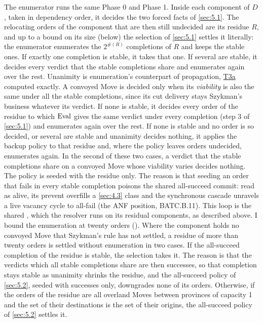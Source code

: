 \documentclass[12pt,a4paper]{article}
\begin{document}
The enumerator runs the same Phase 0 and Phase 1.
Inside each component of $D$, taken in dependency order, it decides the two forced facts of \cref{sec:5.1}.
The relocating orders of the component that are then still undecided are its residue $R$, and up to a bound on its size (below) the selection of \cref{sec:5.1} settles it literally: the enumerator enumerates the $2^{\#(R)}$ completions of $R$ and keeps the stable ones.
If exactly one completion is stable, it takes that one.
If several are stable, it decides every verdict that the stable completions share and enumerates again over the rest.
Unanimity is enumeration's counterpart of propagation, \hyperref[thm:T3]{T3a} computed exactly.
A convoyed Move is decided only when its \emph{viability} is also the same under all the stable completions, since its cut delivery stays Szykman's business whatever its verdict.
If none is stable, it decides every order of the residue to which $\operatorname{Eval}$ gives the same verdict under every completion (step 3 of \cref{sec:5.1}) and enumerates again over the rest.
If none is stable and no order is so decided, or several are stable and unanimity decides nothing, it applies the backup policy to that residue and, where the policy leaves orders undecided, enumerates again.
In the second of these two cases, a verdict that the stable completions share on a convoyed Move whose viability varies decides nothing.
The policy is seeded with the residue only.
The reason is that seeding an order that fails in every stable completion poisons the shared all-succeed commit: read as alive, its prevent overfills a \cref{sec:4.3} class and the synchronous cascade unravels a live vacancy cycle to all-fail (the ANF position, BATC.B.11).
This loop is the shared , which the resolver runs on its residual components, as described above.
I bound the enumeration at twenty orders ().
Where the component holds no convoyed Move that Szykman's rule has not settled, a residue of more than twenty orders is settled without enumeration in two cases.
If the all-succeed completion of the residue is stable, the selection takes it.
The reason is that the verdicts which all stable completions share are then successes, so that completion stays stable as unanimity shrinks the residue, and the all-succeed policy of \cref{sec:5.2}, seeded with successes only, downgrades none of its orders.
Otherwise, if the orders of the residue are all overland Moves between provinces of capacity 1 and the set of their destinations is the set of their origins, the all-succeed policy of \cref{sec:5.2} settles it.
\end{document}
